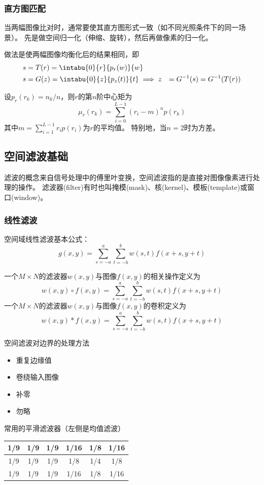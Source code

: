 
\subsubsection{直方图匹配}
当两幅图像比对时，通常要使其直方图形式一致（如不同光照条件下的同一场景）。
先是做空间归一化（伸缩、旋转），然后再做像素的归一化。

做法是使两幅图像均衡化后的结果相同，即
\[\begin{aligned}
s&=T(r)=\intabu{0}{r}{p_r(w)}{w}\\
s&=G(z)=\intabu{0}{z}{p_z(t)}{t}
\implies z&=G^{-1}(s)=G^{-1}(T(r))
\end{aligned}\]

\begin{definition}[$n$阶矩]
设$p_r(r_k)=n_k/n$，则$r$的第$n$阶中心矩为
\[\mu_r(r_k)=\sum_{i=0}^{L-1}(r_i-m)^np(r_k)\]
其中$m=\sum_{i=1}^{L-1}r_ip(r_i)$为$r$的平均值。
特别地，当$n=2$时为方差。
\end{definition}


\subsection{空间滤波基础}
滤波的概念来自信号处理中的傅里叶变换，空间滤波指的是直接对图像像素进行处理的操作。
滤波器(filter)有时也叫掩模(mask)、核(kernel)、模板(template)或窗口(window)。

\subsubsection{线性滤波}
空间域线性滤波基本公式：
\[g(x,y)=\sum_{s=-a}^a\sum_{t=-b}^b w(s,t)f(x+s,y+t)\]

一个$M\times N$的滤波器$w(x,y)$与图像$f(x,y)$的相关操作定义为
\[w(x,y)\circ f(x,y)=\sum_{s=-a}^a\sum_{t=-b}^b w(s,t)f(x+s,y+t)\]
一个$M\times N$的滤波器$w(x,y)$与图像$f(x,y)$的卷积定义为
\[w(x,y)*f(x,y)=\sum_{s=-a}^a\sum_{t=-b}^b w(s,t)f(x+s,y+t)\]

空间滤波对边界的处理方法
\begin{itemize}
	\item 重复边缘值
	\item 卷绕输入图像
	\item 补零
	\item 勿略
\end{itemize}

常用的平滑滤波器（左侧是均值滤波）
\begin{center}
\begin{tabular}{|c|c|c||c|c|c|}\hline
1/9 & 1/9 & 1/9 & 1/16 & 1/8 & 1/16\\\hline
1/9 & 1/9 & 1/9 & 1/8 & 1/4 & 1/8 \\\hline
1/9 & 1/9 & 1/9 & 1/16 & 1/8 & 1/16\\\hline
\end{tabular}
\end{center}

